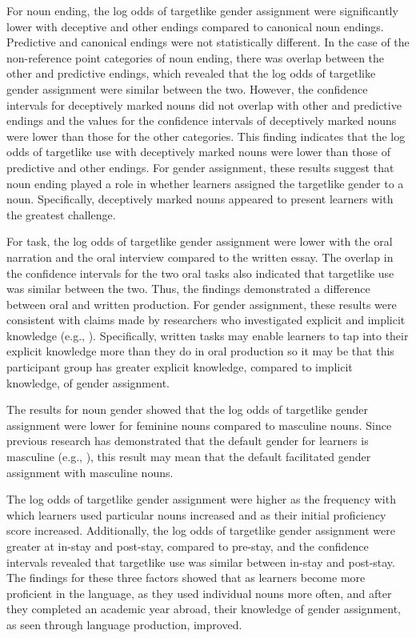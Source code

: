 \documentclass[output=paper,colorlinks,citecolor=brown,modfonts,nonflat]{../langscibook}
\begin{document}
For noun ending, the log odds of targetlike gender assignment were significantly lower with deceptive and other endings compared to canonical noun endings. Predictive and canonical endings were not statistically different. In the case of the non-reference point categories of noun ending, there was overlap between the other and predictive endings, which revealed that the log odds of targetlike gender assignment were similar between the two. However, the confidence intervals for deceptively marked nouns did not overlap with other and predictive endings and the values for the confidence intervals of deceptively marked nouns were lower than those for the other categories. This finding indicates that the log odds of targetlike use with deceptively marked nouns were lower than those of predictive and other endings. For gender assignment, these results suggest that noun ending played a role in whether learners assigned the targetlike gender to a noun. Specifically, deceptively marked nouns appeared to present learners with the greatest challenge.



For task, the log odds of targetlike gender assignment were lower with the oral narration and the oral interview compared to the written essay. The overlap in the confidence intervals for the two oral tasks also indicated that targetlike use was similar between the two. Thus, the findings demonstrated a difference between oral and written production. For gender assignment, these results were consistent with claims made by researchers who investigated explicit and implicit knowledge (e.g., \citealt{Ellis2006}). Specifically, written tasks may enable learners to tap into their explicit knowledge more than they do in oral production so it may be that this participant group has greater explicit knowledge, compared to implicit knowledge, of gender assignment. 



The results for noun gender showed that the log odds of targetlike gender assignment were lower for feminine nouns compared to masculine nouns. Since previous research has demonstrated that the default gender for learners is masculine (e.g., \citealt{López-PregoGabriele2012}), this result may mean that the default facilitated gender assignment with masculine nouns.



The log odds of targetlike gender assignment were higher as the frequency with which learners used particular nouns increased and as their initial proficiency score increased. Additionally, the log odds of targetlike gender assignment were greater at in-stay and post-stay, compared to pre-stay, and the confidence intervals revealed that targetlike use was similar between in-stay and post-stay. The findings for these three factors showed that as learners become more proficient in the language, as they used individual nouns more often, and after they completed an academic year abroad, their knowledge of gender assignment, as seen through language production, improved.
\end{document}
